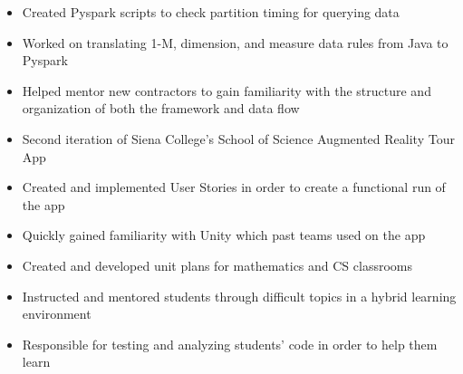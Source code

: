 \documentclass[
	a4paper,
]{fortysecondscv}
\begin{document}
\makefrontsidebar

\begin{cvtable}[1.5]
\end{cvtable}

\begin{cvtable}[1.5]
    \vspace{5mm}
		{\vspace{-3mm}\begin{itemize}[noitemsep, topsep=0pt]
		\item Created Pyspark scripts to check partition timing for querying data
		\item Worked on translating 1-M, dimension, and measure data rules from Java to Pyspark
		\item Helped mentor new contractors to gain familiarity with the structure and organization of both the framework and data flow
		\end{itemize}}
	
	\vspace{5mm}
		{\vspace{-3mm}\begin{itemize}[noitemsep, topsep=0pt]
		\item Second iteration of Siena College's School of Science Augmented Reality Tour App
		\item Created and implemented User Stories in order to create a functional run of the app
		\item Quickly gained familiarity with Unity which past teams used on the app
		\end{itemize}}
	
	\vspace{5mm}
		{\vspace{-3mm}\begin{itemize}[noitemsep, topsep=0pt]
		\item Created and developed unit plans for mathematics and CS classrooms
		\item Instructed and mentored students through difficult topics in a hybrid learning environment
		\item Responsible for testing and analyzing students' code in order to help them learn
		\end{itemize}}
		

\end{cvtable}
\end{document}
